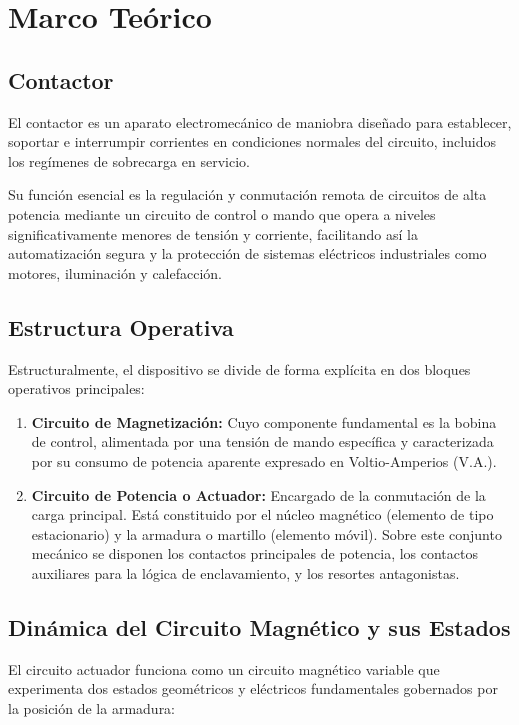 \section{Marco Teórico}
\label{sec:marco_teorico}

\subsection{Contactor}
El contactor es un aparato electromecánico de maniobra diseñado para establecer, soportar e interrumpir corrientes en condiciones normales del circuito, incluidos los regímenes de sobrecarga en servicio.

Su función esencial es la regulación y conmutación remota de circuitos de alta potencia mediante un circuito de control o mando que opera a niveles significativamente menores de tensión y corriente, facilitando así la automatización segura y la protección de sistemas eléctricos industriales como motores, iluminación y calefacción.

\subsection{Estructura Operativa}
Estructuralmente, el dispositivo se divide de forma explícita en dos bloques operativos principales:

\begin{enumerate}
    \item \textbf{Circuito de Magnetización:} Cuyo componente fundamental es la bobina de control, alimentada por una tensión de mando específica y caracterizada por su consumo de potencia aparente expresado en Voltio-Amperios ($\text{V.A.}$).
    \item \textbf{Circuito de Potencia o Actuador:} Encargado de la conmutación de la carga principal. Está constituido por el núcleo magnético (elemento de tipo estacionario) y la armadura o martillo (elemento móvil). Sobre este conjunto mecánico se disponen los contactos principales de potencia, los contactos auxiliares para la lógica de enclavamiento, y los resortes antagonistas.
\end{enumerate}

\subsection{Dinámica del Circuito Magnético y sus Estados}
El circuito actuador funciona como un circuito magnético variable que experimenta dos estados geométricos y eléctricos fundamentales gobernados por la posición de la armadura:

